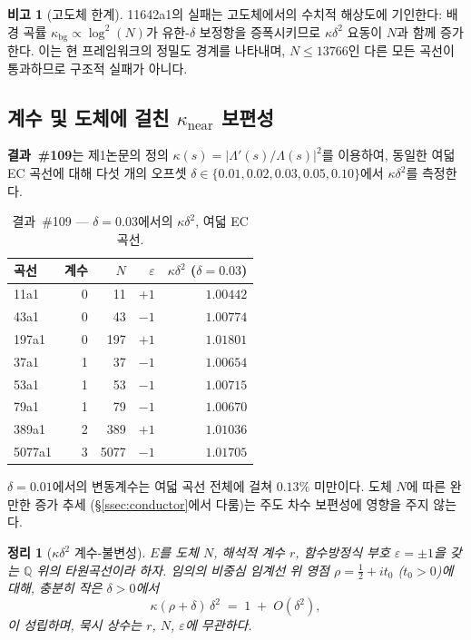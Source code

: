 \documentclass[11pt, a4paper]{article}
\theoremstyle{plain}
\newtheorem{theorem}{정리}
\theoremstyle{definition}
\newtheorem{remark}{비고}[section]
\begin{document}
\begin{remark}[고도체 한계]
\label{rem:highcond}
11642a1의 실패는 고도체에서의 수치적 해상도에 기인한다:
배경 곡률 $\kappa_{\mathrm{bg}} \propto \log^{2}(N)$가
유한-$\delta$ 보정항을 증폭시키므로 $\kappa\delta^{2}$ 요동이
$N$과 함께 증가한다.  이는 현 프레임워크의 정밀도 경계를 나타내며,
$N \leq 13766$인 다른 모든 곡선이 통과하므로 구조적 실패가 아니다.
\end{remark}


\subsection{계수 및 도체에 걸친 $\kappa_{\mathrm{near}}$ 보편성}
\label{ssec:thm5}

\textbf{결과~\#109}는 제1논문의 정의
$\kappa(s)=|\Lambda'(s)/\Lambda(s)|^{2}$를 이용하여,
동일한 여덟 EC 곡선에 대해
다섯 개의 오프셋 $\delta\in\{0.01,0.02,0.03,0.05,0.10\}$에서
$\kappa\delta^{2}$를 측정한다.

\begin{table}[ht]
\centering
\caption{결과~\#109 — $\delta=0.03$에서의 $\kappa\delta^{2}$, 여덟 EC 곡선.}
\label{tab:ec109}
\small
\begin{tabular}{lrrrr}
\toprule
곡선 & 계수 & $N$ & $\varepsilon$ & $\kappa\delta^{2}$ ($\delta=0.03$) \\
\midrule
11a1   & 0 & 11    & $+1$ & $1.00442$ \\
43a1   & 0 & 43    & $-1$ & $1.00774$ \\
197a1  & 0 & 197   & $+1$ & $1.01801$ \\
37a1   & 1 & 37    & $-1$ & $1.00654$ \\
53a1   & 1 & 53    & $-1$ & $1.00715$ \\
79a1   & 1 & 79    & $-1$ & $1.00670$ \\
389a1  & 2 & 389   & $+1$ & $1.01036$ \\
5077a1 & 3 & 5077  & $-1$ & $1.01705$ \\
\bottomrule
\end{tabular}
\end{table}

$\delta=0.01$에서의 변동계수는 여덟 곡선 전체에 걸쳐 $0.13\%$ 미만이다.
도체 $N$에 따른 완만한 증가 추세
(\S\ref{ssec:conductor}에서 다룸)는
주도 차수 보편성에 영향을 주지 않는다.

\begin{theorem}[$\kappa\delta^{2}$ 계수-불변성]
\label{thm:rankinv}
  $E$를 도체 $N$, 해석적 계수 $r$,
  함수방정식 부호 $\varepsilon=\pm 1$을 갖는
  $\mathbb{Q}$ 위의 타원곡선이라 하자.
  임의의 비중심 임계선 위 영점 $\rho=\tfrac{1}{2}+it_{0}$
  ($t_{0}>0$)에 대해, 충분히 작은 $\delta>0$에서
  \[
    \kappa(\rho+\delta)\,\delta^{2}
    \;=\; 1 \;+\; O(\delta^{2}),
  \]
  이 성립하며, 묵시 상수는 $r$, $N$, $\varepsilon$에 무관하다.
\end{theorem}
\end{document}
